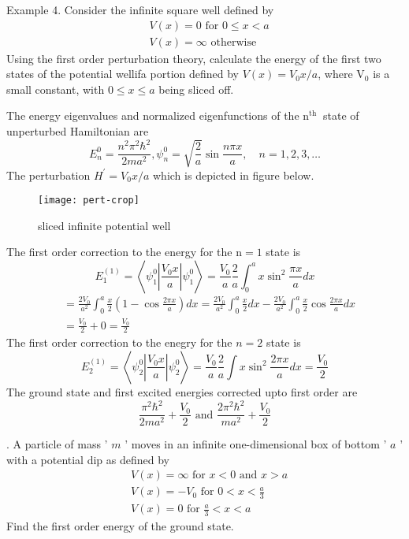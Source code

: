 \begin{exercise}
	Example 4. Consider the infinite square well defined by
	$$
	\begin{aligned}
	&V(x)=0 \text { for } 0 \leq x<a \\
	&V(x)=\infty \text { otherwise }
	\end{aligned}
	$$
	Using the first order perturbation theory, calculate the energy of the first two states of the potential wellifa portion defined by $V(x)=V_{0} x / a$, where $\mathrm{V}_{0}$ is a small constant, with $0 \leq x \leq a$ being sliced off.
\end{exercise}
\begin{answer}
	The energy eigenvalues and normalized eigenfunctions of the $\mathrm{n}^{\text {th }}$ state of unperturbed Hamiltonian are
	$$
	E_{n}^{0}=\frac{n^{2} \pi^{2} \hbar^{2}}{2 m a^{2}}, \psi_{n}^{0}=\sqrt{\frac{2}{a}} \sin \frac{n \pi x}{a}, \quad n=1,2,3, \ldots
	$$
	The perturbation $H^{\prime}=V_{0} x / a$ which is depicted in figure below.\\
	\begin{figure}[H]
		\centering
		\texttt{[image: pert-crop]}
		\caption{sliced infinite potential well}
		\label{}
	\end{figure}
	The first order correction to the energy for the $\mathrm{n}=1$ state is
	$$
	E_{1}^{(1)}=\left\langle\psi_{1}^{0}\left|\frac{V_{0} x}{a}\right| \psi_{1}^{0}\right\rangle=\frac{V_{0}}{a} \frac{2}{a} \int_{0}^{a} x \sin ^{2} \frac{\pi x}{a} d x
	$$
	$$\begin{aligned}
		&=\frac{2 V_{0}}{a^{2}} \int_{0}^{a} \frac{x}{2}\left(1-\cos \frac{2 \pi x}{a}\right) d x=\frac{2 V_{0}}{a^{2}} \int_{0}^{a} \frac{x}{2} d x-\frac{2 V_{0}}{a^{2}} \int_{0}^{a} \frac{x}{2} \cos \frac{2 \pi x}{a} d x \\
		&=\frac{V_{0}}{2}+0=\frac{V_{0}}{2}
	\end{aligned}$$
	The first order correction to the enegry for the $n=2$ state is
	$$
	E_{2}^{(1)}=\left\langle\psi_{2}^{0}\left|\frac{V_{0} x}{a}\right| \psi_{2}^{0}\right\rangle=\frac{V_{0}}{a} \frac{2}{a} \int x \sin ^{2} \frac{2 \pi x}{a} d x=\frac{V_{0}}{2}
	$$
	The ground state and first excited energies corrected upto first order are
	$$
	\frac{\pi^{2} \hbar^{2}}{2 m a^{2}}+\frac{V_{0}}{2} \text { and } \frac{2 \pi^{2} \hbar^{2}}{m a^{2}}+\frac{V_{0}}{2}
	$$
\end{answer}
\begin{exercise}
. A particle of mass ' $m$ ' moves in an infinite one-dimensional box of bottom ' $a$ ' with a potential dip as defined by
	$$
	\begin{aligned}
	&V(x)=\infty \text { for } x<0 \text { and } x>a \\
	&V(x)=-V_{0} \text { for } 0<x<\frac{a}{3} \\
	&V(x)=0 \text { for } \frac{a}{3}<x<a
	\end{aligned}
	$$
	Find the first order energy of the ground state.
\end{exercise}
